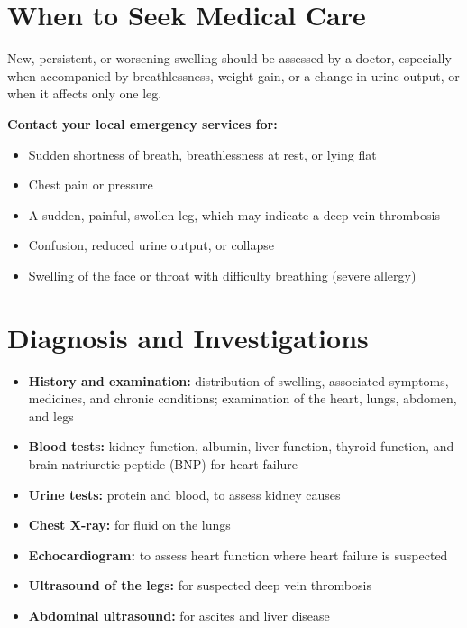\section*{When to Seek Medical Care}
New, persistent, or worsening swelling should be assessed by a doctor, especially when accompanied by breathlessness, weight gain, or a change in urine output, or when it affects only one leg.

\textbf{Contact your local emergency services for:}
\begin{itemize}
    \item Sudden shortness of breath, breathlessness at rest, or lying flat
    \item Chest pain or pressure
    \item A sudden, painful, swollen leg, which may indicate a deep vein thrombosis
    \item Confusion, reduced urine output, or collapse
    \item Swelling of the face or throat with difficulty breathing (severe allergy)
\end{itemize}

\section*{Diagnosis and Investigations}
\begin{itemize}
    \item \textbf{History and examination:} distribution of swelling, associated symptoms, medicines, and chronic conditions; examination of the heart, lungs, abdomen, and legs
    \item \textbf{Blood tests:} kidney function, albumin, liver function, thyroid function, and brain natriuretic peptide (BNP) for heart failure
    \item \textbf{Urine tests:} protein and blood, to assess kidney causes
    \item \textbf{Chest X-ray:} for fluid on the lungs
    \item \textbf{Echocardiogram:} to assess heart function where heart failure is suspected
    \item \textbf{Ultrasound of the legs:} for suspected deep vein thrombosis
    \item \textbf{Abdominal ultrasound:} for ascites and liver disease
\end{itemize}

